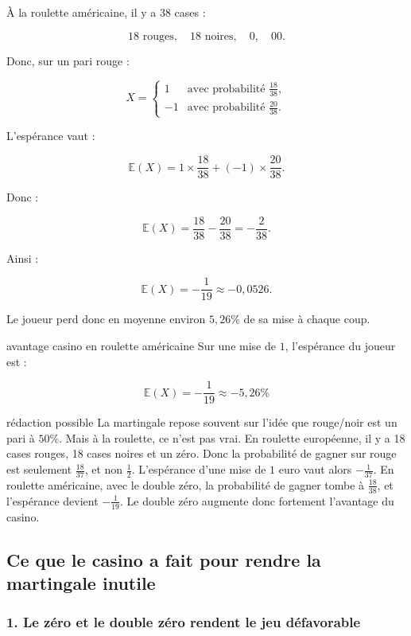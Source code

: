 \documentclass[11pt,a4paper]{article}
\begin{document}
À la roulette américaine, il y a \(38\) cases :

\[
18 \text{ rouges},\quad 18 \text{ noires},\quad 0,\quad 00.
\]

Donc, sur un pari rouge :

\[
X=
\begin{cases}
1 & \text{avec probabilité } \frac{18}{38},\\
-1 & \text{avec probabilité } \frac{20}{38}.
\end{cases}
\]

L'espérance vaut :

\[
\mathbb{E}(X)
=
1\times \frac{18}{38}
+
(-1)\times \frac{20}{38}.
\]

Donc :

\[
\mathbb{E}(X)
=
\frac{18}{38}-\frac{20}{38}
=
-\frac{2}{38}.
\]

Ainsi :

\[
\mathbb{E}(X)=-\frac{1}{19}\approx -0{,}0526.
\]

Le joueur perd donc en moyenne environ \(5{,}26\%\) de sa mise à chaque coup.

\begin{equationbox}{avantage casino en roulette américaine}
Sur une mise de \(1\), l'espérance du joueur est :

\[
\boxed{\mathbb{E}(X)=-\frac{1}{19}\approx -5{,}26\%}
\]
\end{equationbox}

\begin{oral}{rédaction possible}
La martingale repose souvent sur l'idée que rouge/noir est un pari à \(50\%\). Mais à la roulette, ce n'est pas vrai. En roulette européenne, il y a 18 cases rouges, 18 cases noires et un zéro. Donc la probabilité de gagner sur rouge est seulement \(\frac{18}{37}\), et non \(\frac12\). L'espérance d'une mise de \(1\) euro vaut alors \(-\frac{1}{37}\). En roulette américaine, avec le double zéro, la probabilité de gagner tombe à \(\frac{18}{38}\), et l'espérance devient \(-\frac{1}{19}\). Le double zéro augmente donc fortement l'avantage du casino.
\end{oral}

\subsection{Ce que le casino a fait pour rendre la martingale inutile}

\subsubsection*{1. Le zéro et le double zéro rendent le jeu défavorable}
\end{document}
